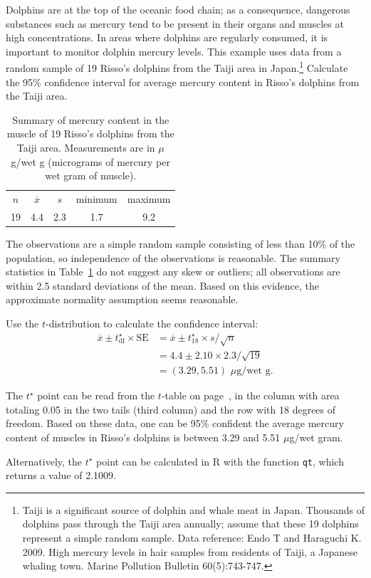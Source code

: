 \begin{example}{Dolphins are at the top of the oceanic food chain; as a consequence, dangerous substances such as mercury tend to be present in their organs and muscles at high concentrations. In areas where dolphins are regularly consumed, it is important to monitor dolphin mercury levels. This example uses data from a random sample of 19 Risso's dolphins from the Taiji area in Japan.\footnote{Taiji is a significant source of dolphin and whale meat in Japan. Thousands of dolphins pass through the Taiji area annually; assume that these 19 dolphins represent a simple random sample. Data reference: Endo T and Haraguchi K. 2009. High mercury levels in hair samples from residents of Taiji, a Japanese whaling town. Marine Pollution Bulletin 60(5):743-747.} Calculate the 95\% confidence interval for average mercury content in Risso's dolphins from the Taiji area.
		
\begin{table}[h]
	\centering
	\begin{tabular}{ccc cc}
		\hline
		$n$ & $\overline{x}$ & $s$ & minimum & maximum \\
		19   & 4.4	  & 2.3  & 1.7	       & 9.2 \\
		\hline
	\end{tabular}
	\caption{Summary of mercury content in the muscle of 19 Risso's dolphins from the Taiji area. Measurements are in $\mu$g/wet g (micrograms of mercury per wet gram of muscle).}
	\label{summaryStatsOfHgInMuscleOfRissosDolphins}
\end{table}		
		
} %

The observations are a simple random sample consisting of less than 10\% of the population, so independence of the observations is reasonable. The summary statistics in Table~\ref{summaryStatsOfHgInMuscleOfRissosDolphins} do not suggest any skew or outliers; all observations are within 2.5 standard deviations of the mean. Based on this evidence, the approximate normality assumption seems reasonable.

Use the $t$-distribution to calculate the confidence interval:
\begin{align*}
\overline{x} \pm  t^{\star}_{\text{df}} \times \text{SE} &= \overline{x}  \pm  t^{\star}_{18}  \times s/\sqrt{n} \\
&= 4.4 \pm  2.10 \times 2.3/\sqrt{19} \\
&= (3.29, 5.51)\,\, \mu\text{g/wet g}.
\end{align*}

The $t^{\star}$ point can be read from the $t$-table on page~\pageref{tTableSample}, in the column with area totaling 0.05 in the two tails (third column) and the row with 18 degrees of freedom. Based on these data, one can be 95\% confident the average mercury content of muscles in Risso's dolphins is between 3.29 and 5.51 $\mu$g/wet gram.

Alternatively, the $t^\star$ point can be calculated in \textsf{R} with the function \texttt{qt}, which returns a value of 2.1009.

\end{example}

